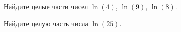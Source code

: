 \begin{problems}
\item
Найдите целые части чисел
$\ln(4)$, $\ln(9)$, $\ln(8)$.

\item
Найдите целую часть числа
$\ln(25)$.

%

\end{problems}

\endgroup %

